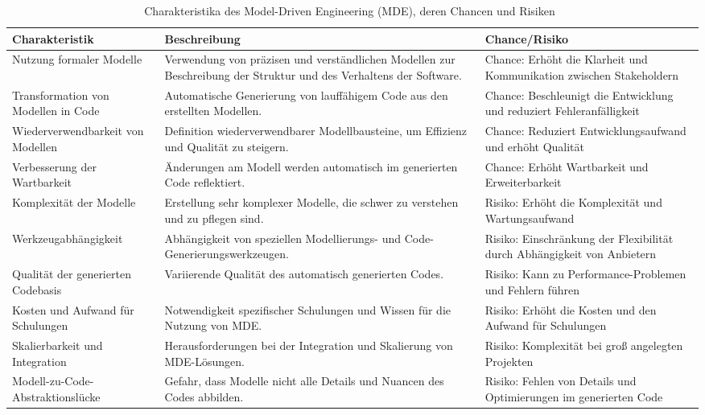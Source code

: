 \begin{table}[h!]
    \centering
    \begin{tabular}{|p{4cm}|p{6cm}|p{4cm}|}
    \hline
    \textbf{Charakteristik} & \textbf{Beschreibung} & \textbf{Chance/Risiko} \\
    \hline
    Nutzung formaler Modelle & Verwendung von präzisen und verständlichen Modellen zur Beschreibung der Struktur und des Verhaltens der Software. & Chance: Erhöht die Klarheit und Kommunikation zwischen Stakeholdern \\
    \hline
    Transformation von Modellen in Code & Automatische Generierung von lauffähigem Code aus den erstellten Modellen. & Chance: Beschleunigt die Entwicklung und reduziert Fehleranfälligkeit \\
    \hline
    Wiederverwendbarkeit von Modellen & Definition wiederverwendbarer Modellbausteine, um Effizienz und Qualität zu steigern. & Chance: Reduziert Entwicklungsaufwand und erhöht Qualität \\
    \hline
    Verbesserung der Wartbarkeit & Änderungen am Modell werden automatisch im generierten Code reflektiert. & Chance: Erhöht Wartbarkeit und Erweiterbarkeit \\
    \hline
    Komplexität der Modelle & Erstellung sehr komplexer Modelle, die schwer zu verstehen und zu pflegen sind. & Risiko: Erhöht die Komplexität und Wartungsaufwand \\
    \hline
    Werkzeugabhängigkeit & Abhängigkeit von speziellen Modellierungs- und Code-Generierungswerkzeugen. & Risiko: Einschränkung der Flexibilität durch Abhängigkeit von Anbietern \\
    \hline
    Qualität der generierten Codebasis & Variierende Qualität des automatisch generierten Codes. & Risiko: Kann zu Performance-Problemen und Fehlern führen \\
    \hline
    Kosten und Aufwand für Schulungen & Notwendigkeit spezifischer Schulungen und Wissen für die Nutzung von MDE. & Risiko: Erhöht die Kosten und den Aufwand für Schulungen \\
    \hline
    Skalierbarkeit und Integration & Herausforderungen bei der Integration und Skalierung von MDE-Lösungen. & Risiko: Komplexität bei groß angelegten Projekten \\
    \hline
    Modell-zu-Code-Abstraktionslücke & Gefahr, dass Modelle nicht alle Details und Nuancen des Codes abbilden. & Risiko: Fehlen von Details und Optimierungen im generierten Code \\
    \hline
    \end{tabular}
    \caption{Charakteristika des Model-Driven Engineering (MDE), deren Chancen und Risiken~\cite{Schmidt_2006, brambilla2017model, Selic_2003, steinberg2008emf, France_2007}}
    \label{tab:mde_characteristics}
\end{table}

